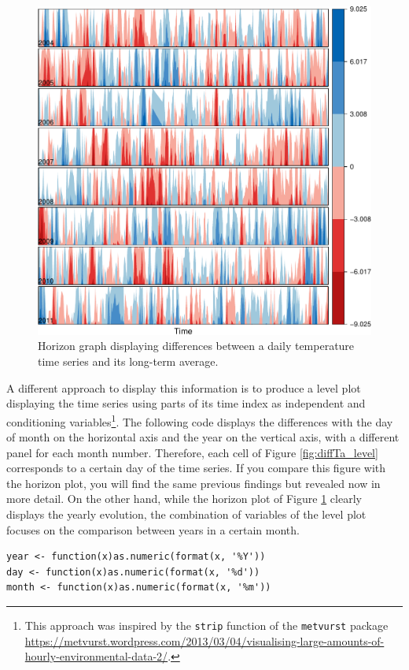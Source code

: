 \documentclass[smallroyalvopaper]{memoir}
\begin{document}
\begin{figure}[htbp]
\centering
\includegraphics[width=.9\linewidth]{figs/diffTa_horizon.pdf}
\caption{Horizon graph displaying differences between a daily temperature time series and its long-term average. \label{fig:diffTa_horizon}}
\end{figure}

A different approach to display this information is to produce a level
plot displaying the time series using parts of its time index as
independent and conditioning variables\footnote{This approach was inspired by the \texttt{strip} function of the
\texttt{metvurst} package
\url{https://metvurst.wordpress.com/2013/03/04/visualising-large-amounts-of-hourly-environmental-data-2/}.}. The following code
displays the differences with the day of month on the horizontal axis
and the year on the vertical axis, with a different panel for each
month number. Therefore, each cell of Figure \ref{fig:diffTa_level}
corresponds to a certain day of the time series. If you compare this
figure with the horizon plot, you will find the same previous findings
but revealed now in more detail. On the other hand, while the horizon
plot of Figure \ref{fig:diffTa_horizon} clearly displays the yearly
evolution, the combination of variables of the level plot focuses on
the comparison between years in a certain month.

\lstset{language=r,label= ,caption= ,captionpos=b,numbers=none}
\begin{lstlisting}
year <- function(x)as.numeric(format(x, '%Y'))
day <- function(x)as.numeric(format(x, '%d'))
month <- function(x)as.numeric(format(x, '%m'))
\end{lstlisting}
\end{document}
